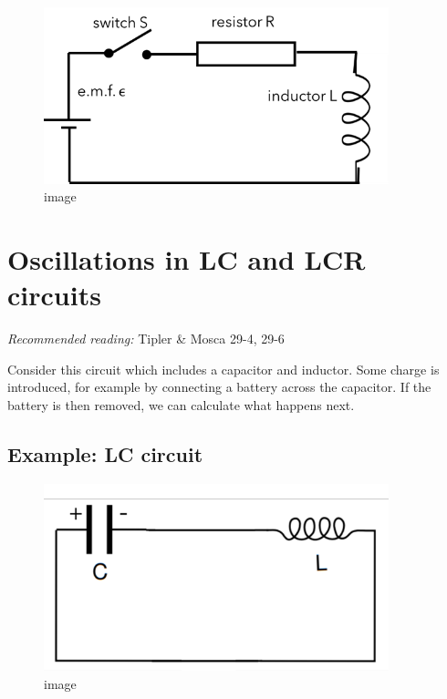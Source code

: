 \documentclass[
]{book}
\begin{document}
\begin{figure}
\centering
\includegraphics[width=100mm,height=\textheight]{Figures/LR_circuit.png}
\caption{image}
\end{figure}

\hypertarget{oscillations-in-lc-and-lcr-circuits}{%
\section{Oscillations in LC and LCR circuits}\label{oscillations-in-lc-and-lcr-circuits}}

\emph{Recommended reading:} Tipler \& Mosca 29-4, 29-6

Consider this circuit which includes a capacitor and inductor. Some
charge is introduced, for example by connecting a battery across the
capacitor. If the battery is then removed, we can calculate what happens
next.

\hypertarget{example-lc-circuit}{%
\subsection*{Example: LC circuit}\label{example-lc-circuit}}

\begin{figure}
\centering
\includegraphics[width=100mm,height=\textheight]{Figures/LC_circuit.png}
\caption{image}
\end{figure}
\end{document}
